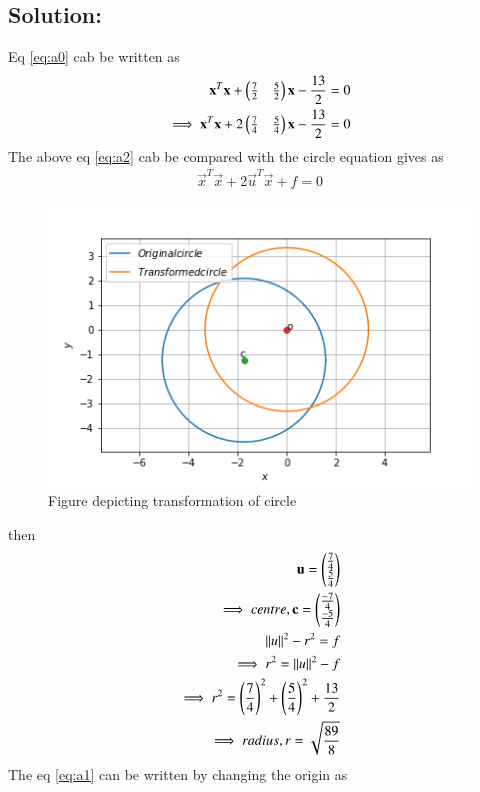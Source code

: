 \documentclass[journal,12pt,twocolumn]{IEEEtran}
\begin{document}
\subsection*{Solution:}
Eq \eqref{eq:a0} cab be written as
\begin{align}
\mathbf{x}^T\mathbf{x}+\begin{pmatrix}\frac{7}{2}&\frac{5}{2}\end{pmatrix}\mathbf{x}-\frac{13}{2}=0\\
\implies \mathbf{x}^T\mathbf{x}+2\begin{pmatrix}\frac{7}{4}&\frac{5}{4}\end{pmatrix}\mathbf{x}-\frac{13}{2}=0
\label{eq:a2}
\end{align}
The above eq \eqref{eq:a2} cab be compared with the circle equation gives as
\begin{align}
\vec{x}^T\vec{x}+2\vec{u}^T\vec{x}+f=0
\label{eq:a3}
\end{align}
\begin{figure}[!ht]
	\centering
	\includegraphics[width=\columnwidth]{circle.png}
	\caption{Figure depicting transformation of circle}
	\label{myfig}
\end{figure}
then
\begin{align}
\mathbf{u} = \begin{pmatrix}\frac{7}{4}\\\frac{5}{4}\end{pmatrix}\\
\label{eq:a4}
\implies centre, \mathbf{c} = \begin{pmatrix}\frac{-7}{4}\\\frac{-5}{4}\end{pmatrix}\\
\left\lVert u\right\rVert^2 - r^2 = f\\
\implies r^2 = \left\lVert u\right\rVert^2 - f\\
\implies r^2 = \left(\frac{7}{4}\right)^2+\left(\frac{5}{4}\right)^2+\frac{13}{2}\\
\implies radius, r = \sqrt{\frac{89}{8}}
\end{align}
The eq \eqref{eq:a1} can be written by changing the origin as
\end{document}
